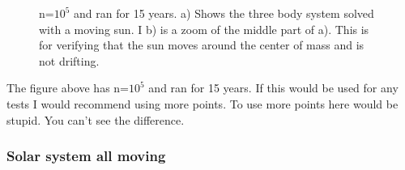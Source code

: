 \begin{figure}[H]
\begin{subfigure}{0.5\textwidth}
        \caption{}
    \end{subfigure}
    \caption{ n=$10^5$ and ran for 15 years. a) Shows the three body system solved with a moving sun. I b) is a zoom of the middle part of a). This is for verifying that the sun moves around the center of mass and is not drifting.}
    \label{fig:three-body-moving}
\end{figure}

The figure above has n=$10^5$ and ran for 15 years. If this would be used for any tests I would recommend using more points. To use more points here would be stupid. You can't see the difference.

\subsubsection{Solar system all moving}

